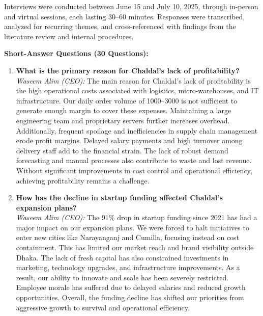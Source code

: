 \documentclass[12pt,a4paper]{article}
\begin{document}
Interviews were conducted between June 15 and July 10, 2025, through in-person and virtual sessions, each lasting 30–60 minutes. Responses were transcribed, analyzed for recurring themes, and cross-referenced with findings from the literature review and internal procedures.

\textbf{Short-Answer Questions (30 Questions):}

\begin{enumerate}
        \item \textbf{What is the primary reason for Chaldal’s lack of profitability?} \\
        \textit{Waseem Alim (CEO):} The main reason for Chaldal’s lack of profitability is the high operational costs associated with logistics, micro-warehouses, and IT infrastructure. Our daily order volume of 1000–3000 is not sufficient to generate enough margin to cover these expenses. Maintaining a large engineering team and proprietary servers further increases overhead. Additionally, frequent spoilage and inefficiencies in supply chain management erode profit margins. Delayed salary payments and high turnover among delivery staff add to the financial strain. The lack of robust demand forecasting and manual processes also contribute to waste and lost revenue. Without significant improvements in cost control and operational efficiency, achieving profitability remains a challenge.

        \item \textbf{How has the decline in startup funding affected Chaldal’s expansion plans?} \\
        \textit{Waseem Alim (CEO):} The 91\% drop in startup funding since 2021 has had a major impact on our expansion plans. We were forced to halt initiatives to enter new cities like Narayanganj and Cumilla, focusing instead on cost containment. This has limited our market reach and brand visibility outside Dhaka. The lack of fresh capital has also constrained investments in marketing, technology upgrades, and infrastructure improvements. As a result, our ability to innovate and scale has been severely restricted. Employee morale has suffered due to delayed salaries and reduced growth opportunities. Overall, the funding decline has shifted our priorities from aggressive growth to survival and operational efficiency.


\end{enumerate}
\end{document}
